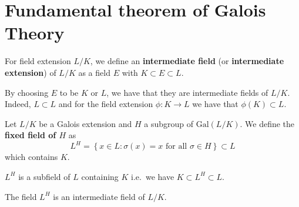 \documentclass[12pt, a4paper]{article}
\newcommand{\gal}{\text{Gal}}
\begin{document}
\section{Fundamental theorem of Galois Theory}

\begin{definition}
    For field extension \(L/K\), we define an \textbf{intermediate field} (or \textbf{intermediate extension}) of \(L/K\) as a field \(E\) with \(K \subset E \subset L\).
\end{definition}

\begin{mdremark}
    By choosing \(E\) to be \(K\) or \(L\), we have that they are intermediate fields of \(L/K\). Indeed, \(L \subset L\) and for the field extension \(\phi:K\to L\) we have that \(\phi(K)\subset L\).
\end{mdremark}

\begin{definition}
    Let \(L/K\) be a Galois extension and \(H\) a subgroup of \(\gal(L/K)\). We define the \textbf{fixed field of \(H\)} as 
    \[L^H = \left\{ x \in L : \sigma(x)=x \text{ for all }\sigma\in H \right\}\subset L\]
    which contains \(K\).
\end{definition}

\begin{mdremark}
    \(L^H\) is a subfield of \(L\) containing \(K\) i.e.\ we have \(K \subset L^H \subset L\).
\end{mdremark}

\begin{proposition}
    The field \(L^H\) is an intermediate field of \(L/K\).
\end{proposition}
\end{document}
